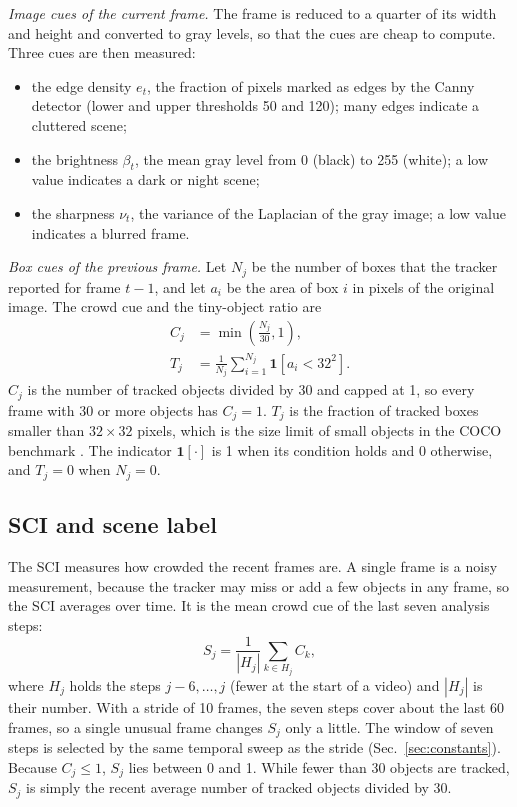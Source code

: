 \documentclass[journal]{new-aiaa}
\begin{document}
\emph{Image cues of the current frame.} The frame is reduced to a quarter of
its width and height and converted to gray levels, so that the cues are cheap
to compute. Three cues are then measured:
\begin{itemize}
\item the edge density $e_t$, the fraction of pixels marked as edges by the
      Canny detector (lower and upper thresholds 50 and 120); many edges
      indicate a cluttered scene;
\item the brightness $\beta_t$, the mean gray level from 0 (black) to 255
      (white); a low value indicates a dark or night scene;
\item the sharpness $\nu_t$, the variance of the Laplacian of the gray image;
      a low value indicates a blurred frame.
\end{itemize}

\emph{Box cues of the previous frame.} Let $N_j$ be the number of boxes that
the tracker reported for frame $t-1$, and let $a_i$ be the area of box $i$ in
pixels of the original image. The crowd cue and the tiny-object ratio are
\begin{align}
C_j&=\min\!\left(\frac{N_j}{30},1\right),\label{eq:crowd}\\
T_j&=\frac{1}{N_j}\sum_{i=1}^{N_j}\mathbf{1}\!\left[a_i<32^2\right].\label{eq:tiny}
\end{align}
$C_j$ is the number of tracked objects divided by 30 and capped at 1, so every
frame with 30 or more objects has $C_j=1$. $T_j$ is the fraction of tracked
boxes smaller than $32\times32$ pixels, which is the size limit of small
objects in the COCO benchmark \cite{lin2014coco}. The indicator
$\mathbf{1}[\cdot]$ is 1 when its condition holds and 0 otherwise, and $T_j=0$
when $N_j=0$.

\subsection{SCI and scene label}\label{sec:sci}
The SCI measures how crowded the recent frames are.
A single frame is a noisy measurement, because the tracker may miss or add a
few objects in any frame, so the SCI averages over time. It is the mean crowd
cue of the last seven analysis steps:
\begin{equation}
S_j=\frac{1}{|H_j|}\sum_{k\in H_j} C_k,
\label{eq:sci}
\end{equation}
where $H_j$ holds the steps $j-6,\dots,j$ (fewer at the start of a video) and
$|H_j|$ is their number. With a stride of 10 frames, the seven steps cover
about the last 60 frames, so a single unusual frame changes $S_j$ only a little. The
window of seven steps is selected by the same temporal sweep as the stride
(Sec.~\ref{sec:constants}). Because $C_j\le1$, $S_j$ lies between 0 and 1.
While fewer than 30 objects are tracked, $S_j$ is simply the recent average
number of tracked objects divided by 30.
\end{document}
